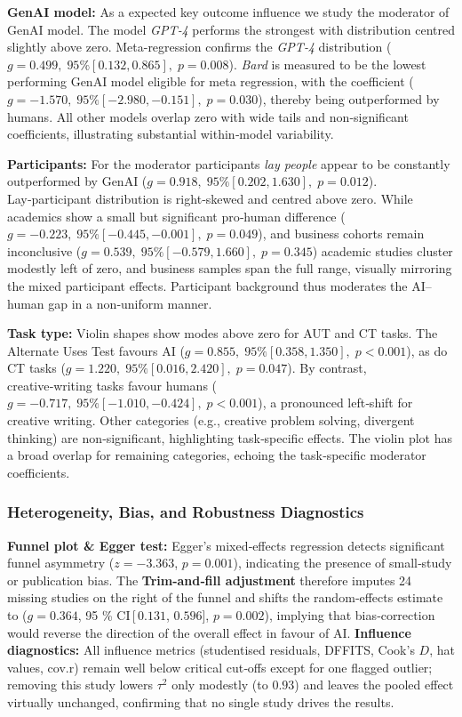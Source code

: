\documentclass[manuscript, screen, review, acmsmall, anonymous]{acmart}
\begin{document}
\textbf{GenAI model:} As a expected key outcome influence we study the moderator of GenAI model. The model \textit{GPT‑4} performs the strongest with distribution centred slightly above zero. Meta-regression confirms the \textit{GPT‑4} distribution (\(g = 0.499,\;95\% [0.132, 0.865],\;p = 0.008\)). \textit{Bard} is measured to be the lowest performing GenAI model eligible for meta regression, with the coefficient (\(g = -1.570,\;95\% [-2.980, -0.151],\;p = 0.030\)), thereby being outperformed by humans. All other models overlap zero with wide tails and non‑significant coefficients, illustrating substantial within‑model variability. 

\textbf{Participants:} For the moderator participants \emph{lay people} appear to be constantly outperformed by GenAI (\(g = 0.918,\;95\% [0.202, 1.630],\;p = 0.012\)). Lay‑participant distribution is right‑skewed and centred above zero. While academics show a small but significant pro‑human difference (\(g = -0.223,\;95\% [-0.445, -0.001],\;p = 0.049\)), and business cohorts remain inconclusive (\(g = 0.539,\;95\% [-0.579, 1.660],\;p = 0.345\)) academic studies cluster modestly left of zero, and business samples span the full range, visually mirroring the mixed participant effects. Participant background thus moderates the AI–human gap in a non‑uniform manner. 

\textbf{Task type:} Violin shapes show modes above zero for AUT and CT tasks. The Alternate Uses Test favours AI (\(g = 0.855,\;95\% [0.358, 1.350],\;p < 0.001\)), as do CT tasks (\(g = 1.220,\;95\% [0.016, 2.420],\;p = 0.047\)). By contrast, creative‑writing tasks favour humans (\(g = -0.717,\;95\% [-1.010, -0.424],\;p < 0.001\)), a pronounced left‑shift for creative writing. Other categories (e.g., creative problem solving, divergent thinking) are non‑significant, highlighting task‑specific effects. The violin plot has a broad overlap for remaining categories, echoing the task‑specific moderator coefficients.

\subsubsection{Heterogeneity, Bias, and Robustness Diagnostics}
\textbf{Funnel plot \& Egger test:} Egger's mixed‑effects regression detects significant funnel asymmetry ($z=-3.363$, $p=0.001$), indicating the presence of small‑study or publication bias. The \textbf{Trim-and‑fill adjustment} therefore imputes 24 missing studies on the right of the funnel and shifts the random‑effects estimate to ($g=0.364$, 95 \% CI\,[\,$0.131$, $0.596$], $p=0.002$), implying that bias‑correction would reverse the direction of the overall effect in favour of AI. 
\textbf{Influence diagnostics:} All influence metrics (studentised residuals, DFFITS, Cook's $D$, hat values, cov.r) remain well below critical cut‑offs except for one flagged outlier; removing this study lowers $\tau^{2}$ only modestly (to $0.93$) and leaves the pooled effect virtually unchanged, confirming that no single study drives the results.
\end{document}
